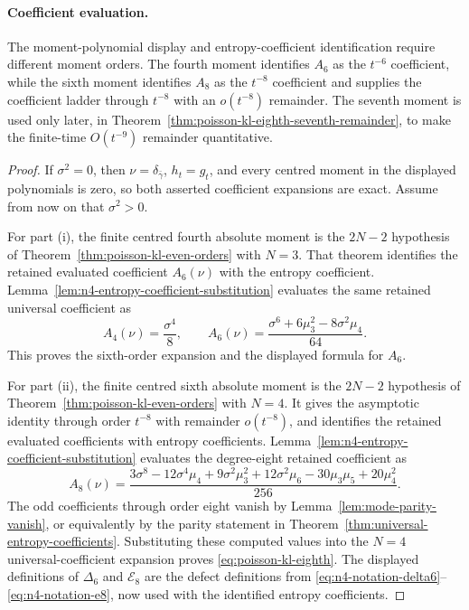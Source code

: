 \paragraph{Coefficient evaluation.}
The moment-polynomial display and entropy-coefficient identification require
different moment orders.  The fourth moment identifies \(A_6\) as the \(t^{-6}\)
coefficient, while the sixth moment identifies \(A_8\) as the \(t^{-8}\)
coefficient and supplies the coefficient ladder through \(t^{-8}\) with an
\(o(t^{-8})\) remainder.  The seventh moment is used only later, in
Theorem~\ref{thm:poisson-kl-eighth-seventh-remainder}, to make the finite-time
\(O(t^{-9})\) remainder quantitative.

\begin{proof}
If \(\sigma^2=0\), then \(\nu=\delta_{\bar{\gamma}}\), \(h_t=g_t\), and every
centred moment in the displayed polynomials is zero, so both asserted
coefficient expansions are exact.  Assume from now on that \(\sigma^2>0\).

For part \textup{(i)}, the finite centred fourth absolute moment is the
\(2N-2\) hypothesis of Theorem~\ref{thm:poisson-kl-even-orders} with
\(N=3\).  That theorem identifies the retained evaluated coefficient
\(A_6(\nu)\) with the entropy coefficient.  Lemma~\ref{lem:n4-entropy-coefficient-substitution}
evaluates the same retained universal coefficient as
\[
A_4(\nu)=\frac{\sigma^4}{8},\qquad
A_6(\nu)
=\frac{\sigma^6+6\mu_3^2-8\sigma^2\mu_4}{64}.
\]
This proves the sixth-order expansion and
the displayed formula for \(A_6\).

For part \textup{(ii)}, the finite centred sixth absolute moment is the
\(2N-2\) hypothesis of Theorem~\ref{thm:poisson-kl-even-orders} with
\(N=4\).  It gives the asymptotic identity through order \(t^{-8}\) with
remainder \(o(t^{-8})\), and identifies the retained evaluated coefficients
with entropy coefficients.  Lemma~\ref{lem:n4-entropy-coefficient-substitution}
evaluates the degree-eight retained coefficient as
\[
A_8(\nu)
=\frac{3\sigma^8-12\sigma^4\mu_4+9\sigma^2\mu_3^2
+12\sigma^2\mu_6-30\mu_3\mu_5+20\mu_4^2}{256}.
\]
The odd coefficients through order eight vanish by
Lemma~\ref{lem:mode-parity-vanish}, or equivalently by the parity statement
in Theorem~\ref{thm:universal-entropy-coefficients}.  Substituting these
computed values into the \(N=4\) universal-coefficient expansion proves
\eqref{eq:poisson-kl-eighth}.  The displayed definitions of
\(\Delta_6\) and \(\mathcal E_8\) are the defect definitions from
\eqref{eq:n4-notation-delta6}--\eqref{eq:n4-notation-e8}, now used with
the identified entropy coefficients.
\end{proof}


